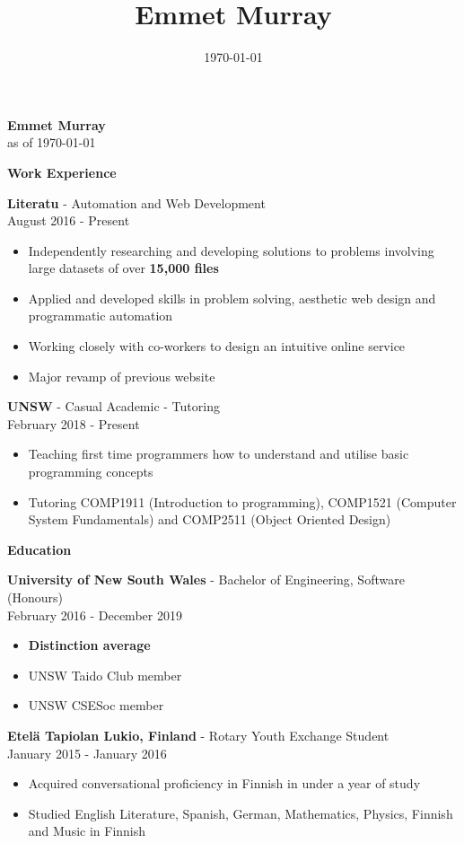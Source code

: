 \documentclass[a4paper]{article}
\title{\textbf{Emmet Murray}}
\date{\today}
\newcommand{\minititle}[1]{{\Large \begin{center} \textbf{#1} \end{center}} \vspace{0.2cm}}
\newcommand{\resumeEntry}[3]{{\large \textbf{#1} - #2} \\ \small{#3} }
\begin{document}
 

\begin{minipage}[t]{0.6\linewidth}   
    {
        \begin{center}
            { \Huge \textbf{Emmet Murray}} \\
            \vspace{0.4cm}
            as of \today
        \end{center}
        \minititle{Work Experience}
        \resumeEntry{Literatu}{Automation and Web Development}{August 2016 - Present}
        \begin{itemize}
            \setlength\itemsep{0.03cm}
            \item Independently researching and developing solutions to problems involving large datasets of over \textbf{15,000 files}
            \item Applied and developed skills in problem solving, aesthetic web design and programmatic automation
            \item Working closely with co-workers to design an intuitive online service
            \item Major revamp of previous website
        \end{itemize}
        \vspace{0.3cm}
        \resumeEntry{UNSW}{Casual Academic - Tutoring}{February 2018 - Present}
        \begin{itemize}
            \setlength\itemsep{0.03cm}
            \item Teaching first time programmers how to understand and utilise basic programming concepts
            \item Tutoring COMP1911 (Introduction to programming), COMP1521 (Computer System Fundamentals) and COMP2511 (Object Oriented Design)
        \end{itemize}
    }
    {
        \vspace{0.1cm}
        \minititle{Education}
        \resumeEntry{University of New South Wales}{Bachelor of Engineering, Software (Honours)}{February 2016 - December 2019}
        \begin{itemize}
            \setlength\itemsep{0.03cm}
            \item \textbf{Distinction average}
            \item UNSW Taido Club member
            \item UNSW CSESoc member
        \end{itemize}
        \vspace{0.4cm}
        \resumeEntry{Etel{\"a} Tapiolan Lukio, Finland}{Rotary Youth Exchange Student}{January 2015 - January 2016}
        \begin{itemize}
            \setlength\itemsep{0.03cm}
            \item Acquired conversational proficiency in Finnish in under a year of study
            \item Studied English Literature, Spanish, German, Mathematics, Physics, Finnish and Music in Finnish


\end{itemize}}
\end{minipage}
\end{document}
